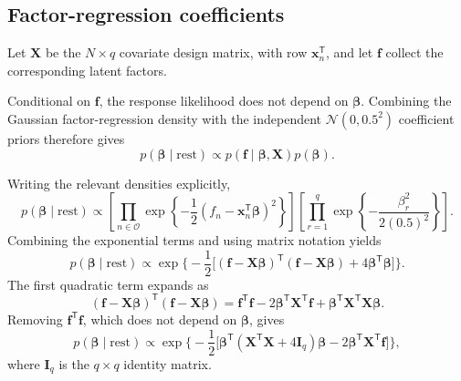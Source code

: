 \documentclass[pdftex,12pt,openright,a4paper,oneside]{book}
\begin{document}
\subsection{Factor-regression coefficients}
\label{app:beta_conditional}

Let $\mathbf{X}$ be the $N\times q$ covariate design
matrix, with row $\mathbf{x}_n^{\mathsf T}$, and let
$\mathbf{f}$ collect the corresponding latent factors.

Conditional on $\mathbf{f}$, the response likelihood
does not depend on $\boldsymbol{\beta}$. Combining
the Gaussian factor-regression density with the
independent $\mathcal{N}(0,0.5^2)$ coefficient priors
therefore gives
\begin{equation*}
p(\boldsymbol{\beta}\mid\mathrm{rest})
\propto
p(\mathbf{f}\mid\boldsymbol{\beta},\mathbf{X})
p(\boldsymbol{\beta}).
\end{equation*}

Writing the relevant densities explicitly,
\begin{equation*}
p(\boldsymbol{\beta}\mid\mathrm{rest})
\propto 
\left[
\prod_{n\in\mathcal{O}}
\exp\!\left\{
-\frac12
(f_n-\mathbf{x}_n^{\mathsf T}\boldsymbol{\beta})^2
\right\}
\right]
\left[
\prod_{r=1}^{q}
\exp\!\left\{
-\frac{\beta_r^2}{2(0.5)^2}
\right\}
\right].
\end{equation*}
Combining the exponential terms and using matrix
notation yields
\begin{equation*}
p(\boldsymbol{\beta}\mid\mathrm{rest})
\propto
\exp\Bigg\{-\frac12\Big[
(\mathbf{f}-\mathbf{X}\boldsymbol{\beta})^{\mathsf T}
(\mathbf{f}-\mathbf{X}\boldsymbol{\beta})+
4\boldsymbol{\beta}^{\mathsf T}\boldsymbol{\beta}
\Big]\Bigg\}.
\end{equation*}
The first quadratic term expands as
\begin{equation*}
(\mathbf{f}-\mathbf{X}\boldsymbol{\beta})^{\mathsf T}
(\mathbf{f}-\mathbf{X}\boldsymbol{\beta})=
\mathbf{f}^{\mathsf T}\mathbf{f}
-2\boldsymbol{\beta}^{\mathsf T}\mathbf{X}^{\mathsf T}
\mathbf{f}+
\boldsymbol{\beta}^{\mathsf T}
\mathbf{X}^{\mathsf T}\mathbf{X}\boldsymbol{\beta}.
\end{equation*}
Removing $\mathbf{f}^{\mathsf T}\mathbf{f}$,
which does not depend on $\boldsymbol{\beta}$, gives
\begin{equation*}
p(\boldsymbol{\beta}\mid\mathrm{rest})
\propto
\exp\Bigg\{-\frac12\Big[
\boldsymbol{\beta}^{\mathsf T}
(\mathbf{X}^{\mathsf T}\mathbf{X}+4\mathbf{I}_q)
\boldsymbol{\beta}-
2\boldsymbol{\beta}^{\mathsf T}
\mathbf{X}^{\mathsf T}\mathbf{f}
\Big]\Bigg\},
\end{equation*}
where $\mathbf{I}_q$ is the $q\times q$ identity matrix.
\end{document}
